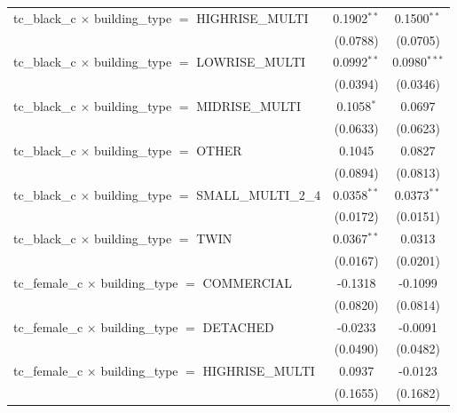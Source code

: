 \begin{tabular}{lcc}
   tc\_black\_c $\times$ building\_type $=$ HIGHRISE\_MULTI            & 0.1902$^{**}$   & 0.1500$^{**}$\\   
                                                                       & (0.0788)        & (0.0705)\\   
   tc\_black\_c $\times$ building\_type $=$ LOWRISE\_MULTI             & 0.0992$^{**}$   & 0.0980$^{***}$\\   
                                                                       & (0.0394)        & (0.0346)\\   
   tc\_black\_c $\times$ building\_type $=$ MIDRISE\_MULTI             & 0.1058$^{*}$    & 0.0697\\   
                                                                       & (0.0633)        & (0.0623)\\   
   tc\_black\_c $\times$ building\_type $=$ OTHER                      & 0.1045          & 0.0827\\   
                                                                       & (0.0894)        & (0.0813)\\   
   tc\_black\_c $\times$ building\_type $=$ SMALL\_MULTI\_2\_4         & 0.0358$^{**}$   & 0.0373$^{**}$\\   
                                                                       & (0.0172)        & (0.0151)\\   
   tc\_black\_c $\times$ building\_type $=$ TWIN                       & 0.0367$^{**}$   & 0.0313\\   
                                                                       & (0.0167)        & (0.0201)\\   
   tc\_female\_c $\times$ building\_type $=$ COMMERCIAL                & -0.1318         & -0.1099\\   
                                                                       & (0.0820)        & (0.0814)\\   
   tc\_female\_c $\times$ building\_type $=$ DETACHED                  & -0.0233         & -0.0091\\   
                                                                       & (0.0490)        & (0.0482)\\   
   tc\_female\_c $\times$ building\_type $=$ HIGHRISE\_MULTI           & 0.0937          & -0.0123\\   
                                                                       & (0.1655)        & (0.1682)\\   

\end{tabular}
